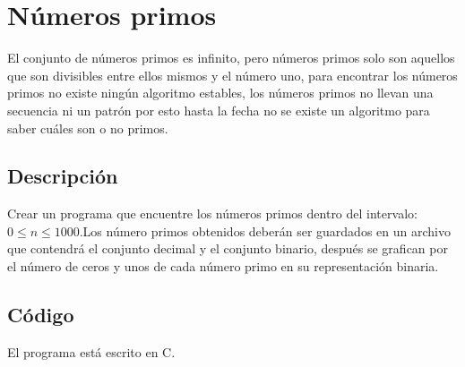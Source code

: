 \documentclass[12pt]{article}
\begin{document}
\section{Números primos}
El conjunto de números primos es infinito, pero números primos solo son aquellos que son divisibles entre ellos mismos y el número uno, para encontrar los números primos no existe ningún algoritmo estables, los números primos no llevan una secuencia ni un patrón por esto hasta la fecha no se existe un algoritmo para saber cuáles son o no primos.

\subsection{Descripción }
Crear un programa que encuentre los números primos dentro del intervalo: $0 \leq n \leq 1000$.Los número primos obtenidos deberán ser guardados en un archivo que contendrá el conjunto decimal y el conjunto binario, después se grafican por el número de ceros y unos de cada número primo en su representación binaria.
\subsection{Código}
El programa está  escrito en C.\\
\end{document}

